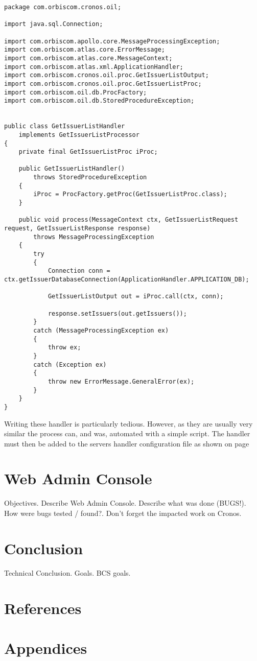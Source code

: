 \documentclass[a4paper, 11pt, titlepage]{article}
\begin{document}
\begin{verbatim}
package com.orbiscom.cronos.oil;

import java.sql.Connection;

import com.orbiscom.apollo.core.MessageProcessingException;
import com.orbiscom.atlas.core.ErrorMessage;
import com.orbiscom.atlas.core.MessageContext;
import com.orbiscom.atlas.xml.ApplicationHandler;
import com.orbiscom.cronos.oil.proc.GetIssuerListOutput;
import com.orbiscom.cronos.oil.proc.GetIssuerListProc;
import com.orbiscom.oil.db.ProcFactory;
import com.orbiscom.oil.db.StoredProcedureException;


public class GetIssuerListHandler
	implements GetIssuerListProcessor
{
	private final GetIssuerListProc iProc;

	public GetIssuerListHandler()
		throws StoredProcedureException
	{
		iProc = ProcFactory.getProc(GetIssuerListProc.class);
	}

	public void process(MessageContext ctx, GetIssuerListRequest request, GetIssuerListResponse response)
		throws MessageProcessingException
	{
		try
		{
			Connection conn = ctx.getIssuerDatabaseConnection(ApplicationHandler.APPLICATION_DB);

			GetIssuerListOutput out = iProc.call(ctx, conn);

			response.setIssuers(out.getIssuers());
		}
		catch (MessageProcessingException ex)
		{
			throw ex;
		}
		catch (Exception ex)
		{
			throw new ErrorMessage.GeneralError(ex);
		}
	}
}
\end{verbatim}
Writing these handler is particularly tedious. However, as they are usually very similar the process can, and was, automated with a simple script.
The handler must then be added to the servers handler configuration file as shown on page \pageref{handlerset}

\cite{Stored procedure for dummys}
\cite{http://wiki.orbiscom.com/index.php/OIL}

\section{Web Admin Console}
Objectives. Describe Web Admin Console. Describe what was done (BUGS!). How were bugs tested / found?. Don't forget the impacted work on Cronos.
\section{Conclusion}
Technical Conclusion. Goals. BCS goals.
\section{References}

\section{Appendices}
\end{document}
